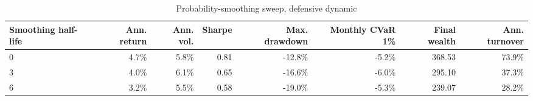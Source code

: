 ﻿\begin{table}[H]
\centering
\caption{Probability-smoothing sweep, defensive dynamic}
\label{tab:allocation-smoothing-defensive}
\small
\begin{adjustbox}{max width=\linewidth}
\begin{tabular}{lrrrrrrr}
\toprule
Smoothing half-life & Ann. return & Ann. vol. & Sharpe & Max. drawdown & Monthly CVaR 1\% & Final wealth & Ann. turnover \\
\midrule
0 & 4.7\% & 5.8\% & 0.81 & -12.8\% & -5.2\% & 368.53 & 73.9\% \\
3 & 4.0\% & 6.1\% & 0.65 & -16.6\% & -6.0\% & 295.10 & 37.3\% \\
6 & 3.2\% & 5.5\% & 0.58 & -19.0\% & -5.3\% & 239.07 & 28.2\% \\
\bottomrule
\end{tabular}
\end{adjustbox}
\end{table}


